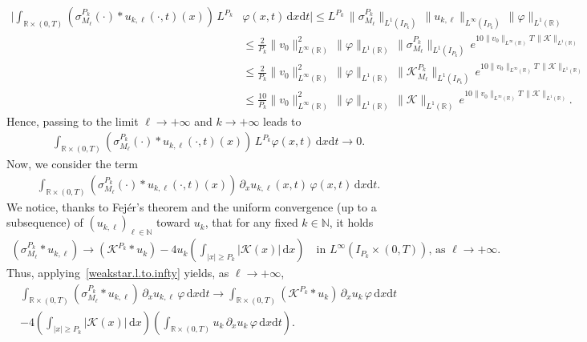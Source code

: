 \documentclass[11pt]{amsart}
\newcommand{\K}{\mathcal{K}}
\newcommand{\dd}{\mathrm{d}}
\newcommand{\pa}{\partial}
\newcommand{\R}{\mathbb{R}}
\newcommand{\N}{\mathbb{N}}
\begin{document}
\begin{appendix}
\begin{align*}
    \Bigg| \int_{\R \times(0,T)}(\sigma_{M_\ell}^{P_k}(\cdot)\ast u_{k,\ell}(\cdot,t)(x)) \, L^{P_k}& \varphi(x,t) \, \dd x \dd t \Bigg| \leq L^{P_k} \, \|\sigma_{M_\ell}^{P_k}\|_{L^1(I_{P_k})} \, \|u_{k,\ell}\|_{L^\infty(I_{P_k})} \, \|\varphi\|_{L^1(\R)}\\
    &\leq \frac{2}{P_k} \|v_0\|_{L^\infty(\R)}^2 \, \|\varphi\|_{L^1(\R)} \, \|\sigma_{M_\ell}^{P_k}\|_{L^1(I_{P_k})} \, e^{10 \|v_0\|_{L^\infty(\R)} T \, \|\K\|_{L^1(\R)}} \\
    &\leq  \frac{2}{P_k} \|v_0\|_{L^\infty(\R)}^2 \, \|\varphi\|_{L^1(\R)}\, \|\K^{P_k}_{M_\ell}\|_{L^1(I_{P_k})} \, e^{10 \|v_0\|_{L^\infty(\R)} T \, \|\K\|_{L^1(\R)}}\\
    &\leq  \frac{10}{P_k} \|v_0\|_{L^\infty(\R)}^2 \, \|\varphi\|_{L^1(\R)} \, \|\K\|_{L^1(\R)} \, e^{10\|v_0\|_{L^\infty(\R)} T \, \|\K\|_{L^1(\R)}}.
\end{align*}
Hence, passing to the limit $\ell \to+\infty$ and $k\to+\infty$ leads to
\begin{align}
    \int_{\R \times(0,T)} (\sigma_{M_\ell}^{P_k}(\cdot)\ast u_{k,\ell}(\cdot,t)(x)) \, L^{P_k} \varphi(x,t)\, \dd x \dd t \to 0.
\end{align}
Now, we consider the term
\begin{align*}
    \int_{\R \times(0,T)}(\sigma_{M_\ell}^{P_k}(\cdot)\ast u_{k,\ell}(\cdot,t)(x))  \, \pa_x u_{k,\ell}(x,t) \, \varphi(x,t) \, \dd x \dd t.
\end{align*}
We notice, thanks to Fej\'er's theorem and the uniform convergence (up to a subsequence) of $(u_{k,\ell})_{\ell\in \N}$ toward $u_k$, that for any fixed $k \in \N$, it holds
\begin{align*}
    (\sigma_{M_\ell}^{P_k} \ast u_{k,\ell}) \to (\K^{P_k} \ast u_k) - {4u_k} \left(\int_{|x|\geq P_k} \left|\K(x)\right| \, \dd x\right) \quad \mbox{in } L^\infty(I_{P_k}\times(0,T)), \, \mbox{as }\ell \to +\infty.
\end{align*}
Thus, applying~\eqref{weakstar.l.to.infty} yields, as $\ell \to +\infty$,
\begin{multline*}
    \int_{\R \times(0,T)} (\sigma_{M_\ell}^{P_k}  \ast u_{k,\ell}) \, \pa_x u_{k,\ell} \, \varphi \, \dd x \dd t \to \int_{\R\times(0,T)} (\K^{P_k}\ast u_k) \, \pa_x u_k\, \varphi \, \dd x \dd t\\
    - {4} \left(\int_{|x|\geq P_k} |\K(x)|\,\dd x\right) \left(\int_{\R \times (0,T)} u_k \, \pa_x u_k \, \varphi \, \dd x \dd t\right).
\end{multline*}

\end{appendix}
\end{document}
